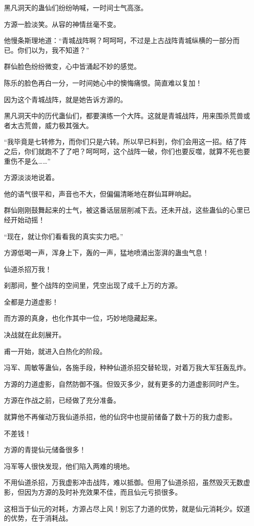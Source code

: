 \begin{this_body}
黑凡洞天的蛊仙们纷纷呐喊，一时间士气高涨。

方源一脸淡笑。从容的神情丝毫不变。

他慢条斯理地道：“青城战阵啊？呵呵呵，不过是上古战阵青城纵横的一部分而已。你们以为，我不知道？”

群仙脸色纷纷微变，心中皆涌起不妙的感觉。

陈乐的脸色再白一分，一时间她心中的懊悔痛恨。简直难以复加！

因为这个青城战阵，就是她告诉方源的。

黑凡洞天中的历代蛊仙们，都要演练一个大阵。这就是青城战阵，用来围杀荒兽或者太古荒兽，威力极其强大。

“我毕竟是七转修为，而你们只是六转。所以早已料到，你们会用这一招。结了阵之后，你们就跑不了了吧？呵呵呵，这个战阵一破，你们也要反噬，就算不死也要重伤不是么……”

方源淡淡地说着。

他的语气很平和，声音也不大，但偏偏清晰地在群仙耳畔响起。

群仙刚刚鼓舞起来的士气，被这番话层层削减下去。还未开战，这些蛊仙的心里已经开始动摇！

“现在，就让你们看看我的真实实力吧。”

方源低喝一声，浑身上下，轰的一声，猛地喷涌出澎湃的蛊虫气息！

仙道杀招万我！

刹那间，整个战阵的空间里，凭空出现了成千上万的方源。

全都是力道虚影！

而方源的真身，也化作其中一位，巧妙地隐藏起来。

决战就在此刻展开。

甫一开始，就进入白热化的阶段。

冯军、周敏等蛊仙，各施手段，种种仙道杀招交替轮现，对着万我大军狂轰乱炸。

方源的力道虚影，自然防御不强。但毁灭多少，就有更多的力道虚影同时产生。

方源在作战之前，已经做了充分准备。

就算他不再催动万我仙道杀招，他的仙窍中也提前储备了数十万的我力虚影。

不差钱！

方源的青提仙元储备很多！

冯军等人很快发现，他们陷入两难的境地。

不用仙道杀招，万我虚影冲击战阵，难以抵御。但用了仙道杀招，虽然毁灭无数虚影，但因为方源的及时补充效果不佳，而且仙元亏损很多。

这相当于仙元的对耗，方源占尽上风！别忘了力道的优势，就是仙元消耗少。奴道的优势，在于消耗战。


\end{this_body}
